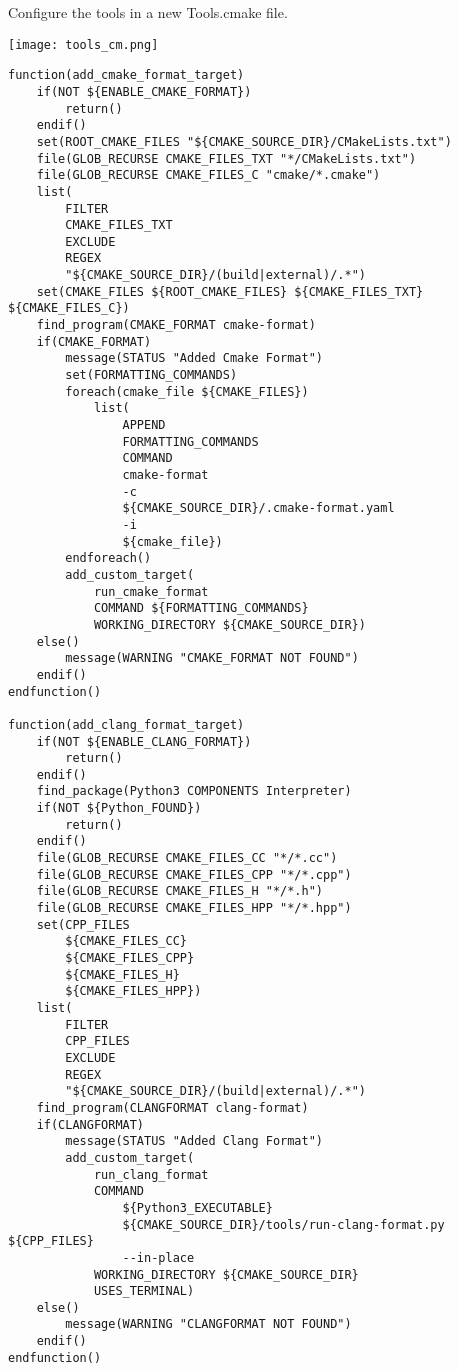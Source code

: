\documentclass[openany]{report}
\begin{document}
Configure the tools in a new Tools.cmake file.

\begin{center}
    \texttt{[image: tools\_cm.png]}
\end{center}


\begin{verbatim}
function(add_cmake_format_target)
    if(NOT ${ENABLE_CMAKE_FORMAT})
        return()
    endif()
    set(ROOT_CMAKE_FILES "${CMAKE_SOURCE_DIR}/CMakeLists.txt")
    file(GLOB_RECURSE CMAKE_FILES_TXT "*/CMakeLists.txt")
    file(GLOB_RECURSE CMAKE_FILES_C "cmake/*.cmake")
    list(
        FILTER
        CMAKE_FILES_TXT
        EXCLUDE
        REGEX
        "${CMAKE_SOURCE_DIR}/(build|external)/.*")
    set(CMAKE_FILES ${ROOT_CMAKE_FILES} ${CMAKE_FILES_TXT} ${CMAKE_FILES_C})
    find_program(CMAKE_FORMAT cmake-format)
    if(CMAKE_FORMAT)
        message(STATUS "Added Cmake Format")
        set(FORMATTING_COMMANDS)
        foreach(cmake_file ${CMAKE_FILES})
            list(
                APPEND
                FORMATTING_COMMANDS
                COMMAND
                cmake-format
                -c
                ${CMAKE_SOURCE_DIR}/.cmake-format.yaml
                -i
                ${cmake_file})
        endforeach()
        add_custom_target(
            run_cmake_format
            COMMAND ${FORMATTING_COMMANDS}
            WORKING_DIRECTORY ${CMAKE_SOURCE_DIR})
    else()
        message(WARNING "CMAKE_FORMAT NOT FOUND")
    endif()
endfunction()

function(add_clang_format_target)
    if(NOT ${ENABLE_CLANG_FORMAT})
        return()
    endif()
    find_package(Python3 COMPONENTS Interpreter)
    if(NOT ${Python_FOUND})
        return()
    endif()
    file(GLOB_RECURSE CMAKE_FILES_CC "*/*.cc")
    file(GLOB_RECURSE CMAKE_FILES_CPP "*/*.cpp")
    file(GLOB_RECURSE CMAKE_FILES_H "*/*.h")
    file(GLOB_RECURSE CMAKE_FILES_HPP "*/*.hpp")
    set(CPP_FILES
        ${CMAKE_FILES_CC}
        ${CMAKE_FILES_CPP}
        ${CMAKE_FILES_H}
        ${CMAKE_FILES_HPP})
    list(
        FILTER
        CPP_FILES
        EXCLUDE
        REGEX
        "${CMAKE_SOURCE_DIR}/(build|external)/.*")
    find_program(CLANGFORMAT clang-format)
    if(CLANGFORMAT)
        message(STATUS "Added Clang Format")
        add_custom_target(
            run_clang_format
            COMMAND
                ${Python3_EXECUTABLE}
                ${CMAKE_SOURCE_DIR}/tools/run-clang-format.py ${CPP_FILES}
                --in-place
            WORKING_DIRECTORY ${CMAKE_SOURCE_DIR}
            USES_TERMINAL)
    else()
        message(WARNING "CLANGFORMAT NOT FOUND")
    endif()
endfunction()


\end{verbatim}
\end{document}
